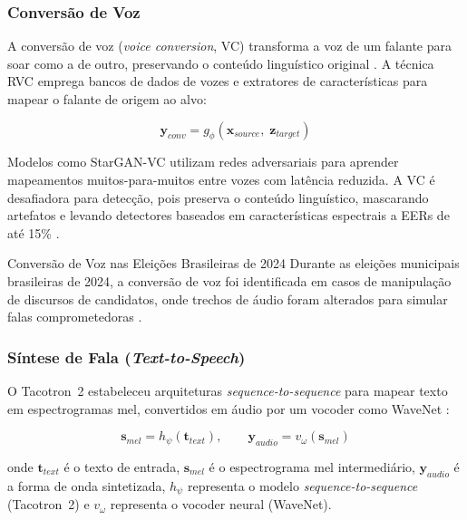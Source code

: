 \documentclass[12pt,a4paper]{article}
\begin{document}
\subsubsection{Conversão de Voz}

A conversão de voz (\textit{voice conversion}, VC) transforma a voz de um
falante para soar como a de outro, preservando o conteúdo linguístico original
\cite{bird2023realtime}. A técnica RVC emprega bancos de dados de vozes e
extratores de características para mapear o falante de origem ao alvo:

\begin{equation}
\label{eq:voice_conv}
\mathbf{y}_{conv} = g_{\phi}(\mathbf{x}_{source},\; \mathbf{z}_{target})
\end{equation}

Modelos como StarGAN-VC \cite{kameoka2018stargan} utilizam redes adversariais
para aprender mapeamentos muitos-para-muitos entre vozes com latência reduzida.
A VC é desafiadora para detecção, pois preserva o conteúdo linguístico,
mascarando artefatos e levando detectores baseados em características espectrais
a EERs de até 15\% \cite{wang2024asvspoof5}.

\begin{infobox}{Conversão de Voz nas Eleições Brasileiras de 2024}
Durante as eleições municipais brasileiras de 2024, a conversão de voz foi
identificada em casos de manipulação de discursos de candidatos, onde trechos
de áudio foram alterados para simular falas comprometedoras \cite{farrugia2024}.
\end{infobox}

\subsubsection{Síntese de Fala (\textit{Text-to-Speech})}

O Tacotron~2 \cite{shen2018natural} estabeleceu arquiteturas
\textit{sequence-to-sequence} para mapear texto em espectrogramas mel,
convertidos em áudio por um vocoder como WaveNet \cite{oord2016wavenet}:

\begin{equation}
\label{eq:tts}
\mathbf{s}_{mel} = h_{\psi}(\mathbf{t}_{text}), \qquad
\mathbf{y}_{audio} = v_{\omega}(\mathbf{s}_{mel})
\end{equation}

\noindent
onde $\mathbf{t}_{text}$ é o texto de entrada, $\mathbf{s}_{mel}$ é o
espectrograma mel intermediário, $\mathbf{y}_{audio}$ é a forma de onda
sintetizada, $h_{\psi}$ representa o modelo \textit{sequence-to-sequence}
(Tacotron~2) e $v_{\omega}$ representa o vocoder neural (WaveNet).
\end{document}
